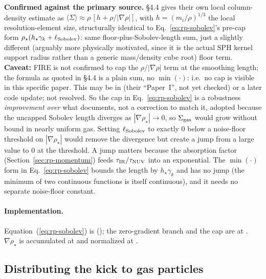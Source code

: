 \textbf{Confirmed against the primary source.}
\citet{Hopkins2020} \S4.4 gives their own local column-density
estimate as $\langle\Sigma\rangle \approx \rho\,[h + \rho/|\nabla\rho|]$,
with $h=(m_i/\rho)^{1/3}$ the local resolution-element size,
structurally identical to Eq.~\ref{eq:rp-sobolev}'s pre-cap form
$\rho_\star(h_\star\gamma_k + \ell_{\rm Sobolev})$: same
floor-plus-Sobolev-length sum, just a slightly different (arguably
more physically motivated, since it is the actual SPH kernel support
radius rather than a generic mass/density cube root) floor term.
\textbf{Caveat:} FIRE is not confirmed to cap the $\rho/|\nabla\rho|$ term at the
smoothing length; the formula as quoted in \citet{Hopkins2020} \S4.4
is a plain sum, no $\min(\cdot)$: i.e.\ no cap is visible in this
specific paper. This may be in \citet{Hopkins2018} (their ``Paper~I'',
not yet checked) or a later code update; not resolved. So the cap in
Eq.~\ref{eq:rp-sobolev} is a robustness \emph{improvement over} what
\citet{Hopkins2020} documents, not a correction to match it, adopted
because the uncapped Sobolev length diverges as
$|\nabla\rho_\star|\to0$, so $\Sigma_{\rm gas}$ would grow without bound in
nearly uniform gas. Setting $\ell_{\rm Sobolev}$ to exactly 0 below a
noise-floor threshold on $|\nabla\rho_\star|$ would remove the divergence
but create a jump from a large value to 0 at the threshold. A jump matters
because the absorption factor (Section~\ref{sec:rp-momentum}) feeds
$\tau_{\rm IR}/\tau_{\rm NUV}$ into an exponential. The $\min(\cdot)$ form in Eq.~\ref{eq:rp-sobolev} bounds
the length by $h_\star\gamma_k$ and has no jump (the minimum of two continuous functions
is itself continuous), and it needs no separate noise-floor constant.

\paragraph{Implementation.} Equation~(\ref{eq:rp-sobolev}) is
(); the zero-gradient branch and
the cap are at . $\nabla\rho_\star$ is
accumulated at  and normalized at
.

\subsection{Distributing the kick to gas particles}
\label{sec:rp-distribute}

